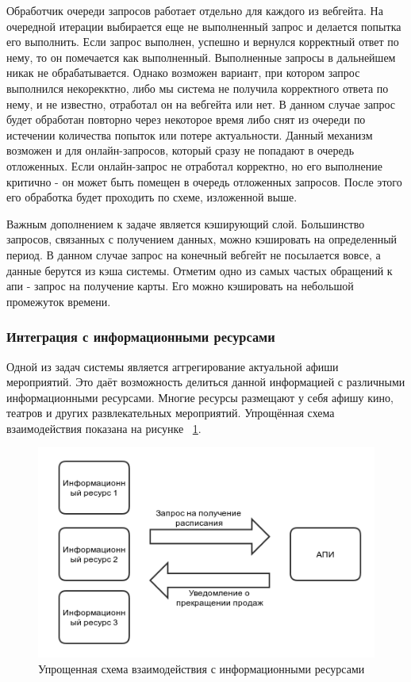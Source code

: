 Обработчик очереди запросов работает отдельно для каждого из вебгейта. На очередной итерации выбирается еще не выполненный запрос и делается попытка его выполнить. Если запрос выполнен, успешно и вернулся корректный ответ по нему, то он помечается как выполненный. Выполненные запросы в дальнейшем никак не обрабатывается. Однако возможен вариант, при котором запрос выполнился некорекктно, либо мы система не получила корректного ответа по нему, и не известно, отработал он на вебгейта или нет. В данном случае запрос будет обработан повторно через некоторое время либо снят из очереди по истечении количества попыток или потере актуальности. Данный механизм возможен и для онлайн-запросов, который сразу не попадают в очередь отложенных. Если онлайн-запрос не отработал корректно, но его выполнение критично - он может быть помещен в очередь отложенных запросов. После этого его обработка будет проходить по схеме, изложенной выше.

Важным дополнением к задаче является кэширующий слой. Большинство запросов, связанных с получением данных, можно кэшировать на определенный период. В данном случае запрос на конечный вебгейт не посылается вовсе, а данные берутся из кэша системы. Отметим одно из самых частых обращений к апи - запрос на получение карты. Его можно кэшировать на небольшой промежуток времени.


\subsubsection{Интеграция с информационными ресурсами}

Одной из задач системы является аггрегирование актуальной афиши мероприятий. Это даёт возможность делиться данной информацией с различными информационными ресурсами. Многие ресурсы размещают у себя афишу кино, театров и других развлекательных мероприятий. Упрощённая схема взаимодействия показана на рисунке ~\ref{fig:ir-schema}.

\begin{figure}
  	\centering
 	\includegraphics[width=1\textwidth]{images/ir-schema.png}
  	\caption{Упрощенная схема взаимодействия с информационными ресурсами}
    \label{fig:ir-schema}
\end{figure}

